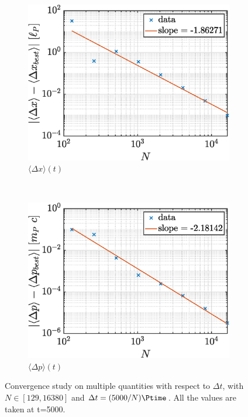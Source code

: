 \documentclass[a4paper,12pt,twoside]{article}
\begin{document}
\begin{figure}[h]
\begin{subfigure}{0.45\textwidth}
        \includegraphics[width=\textwidth]{graphs/i_conv_dx.eps}
        \caption{$\langle \Delta x \rangle (t)$}
        \label{fig:i_conv_dx}
      \end{subfigure}
      ~
      \begin{subfigure}{0.45\textwidth}
        \includegraphics[width=\textwidth]{graphs/i_conv_dp.eps}
        \caption{$\langle \Delta p \rangle (t)$}
        \label{fig:i_conv_dp}
      \end{subfigure}
      \caption{Convergence study on multiple quantities with respect to $\Delta t$, with $N\in[\num{129}, \num{16380}]$ and $\Delta t = (\num{5000}/N) \si{\Ptime}$. All the values are taken at t=\SI{5000}{\Ptime}.}
      \label{fig:i_conv}
    \end{figure}
\end{document}
